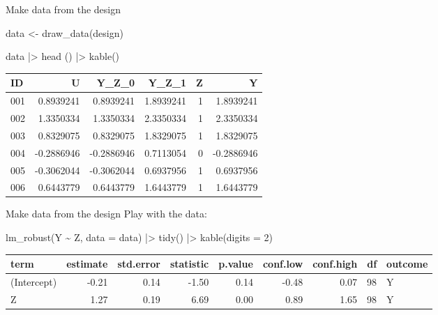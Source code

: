 \documentclass[
  11pt,
  ignorenonframetext,
]{beamer}
\newenvironment{Shaded}{\begin{snugshade}}{\end{snugshade}}
\newcommand{\AttributeTok}[1]{\textcolor[rgb]{0.40,0.45,0.13}{#1}}
\newcommand{\DecValTok}[1]{\textcolor[rgb]{0.68,0.00,0.00}{#1}}
\newcommand{\FunctionTok}[1]{\textcolor[rgb]{0.28,0.35,0.67}{#1}}
\newcommand{\NormalTok}[1]{\textcolor[rgb]{0.00,0.23,0.31}{#1}}
\newcommand{\OtherTok}[1]{\textcolor[rgb]{0.00,0.23,0.31}{#1}}
\newcommand{\SpecialCharTok}[1]{\textcolor[rgb]{0.37,0.37,0.37}{#1}}
\begin{document}
\begin{frame}[fragile]{Make data from the design}
\protect\hypertarget{make-data-from-the-design}{}
\begin{Shaded}
\begin{Highlighting}[]
\NormalTok{data }\OtherTok{\textless{}{-}} \FunctionTok{draw\_data}\NormalTok{(design)}

\NormalTok{data }\SpecialCharTok{|\textgreater{}} \FunctionTok{head}\NormalTok{ () }\SpecialCharTok{|\textgreater{}} \FunctionTok{kable}\NormalTok{()}
\end{Highlighting}
\end{Shaded}

\begin{tabular}{l|r|r|r|r|r}
\hline
ID & U & Y\_Z\_0 & Y\_Z\_1 & Z & Y\\
\hline
001 & 0.8939241 & 0.8939241 & 1.8939241 & 1 & 1.8939241\\
\hline
002 & 1.3350334 & 1.3350334 & 2.3350334 & 1 & 2.3350334\\
\hline
003 & 0.8329075 & 0.8329075 & 1.8329075 & 1 & 1.8329075\\
\hline
004 & -0.2886946 & -0.2886946 & 0.7113054 & 0 & -0.2886946\\
\hline
005 & -0.3062044 & -0.3062044 & 0.6937956 & 1 & 0.6937956\\
\hline
006 & 0.6443779 & 0.6443779 & 1.6443779 & 1 & 1.6443779\\
\hline
\end{tabular}
\end{frame}

\begin{frame}[fragile]{Make data from the design}
\protect\hypertarget{make-data-from-the-design-1}{}
Play with the data:

\begin{Shaded}
\begin{Highlighting}[]
\FunctionTok{lm\_robust}\NormalTok{(Y }\SpecialCharTok{\textasciitilde{}}\NormalTok{ Z, }\AttributeTok{data =}\NormalTok{ data) }\SpecialCharTok{|\textgreater{}}
  \FunctionTok{tidy}\NormalTok{() }\SpecialCharTok{|\textgreater{}}
  \FunctionTok{kable}\NormalTok{(}\AttributeTok{digits =} \DecValTok{2}\NormalTok{)}
\end{Highlighting}
\end{Shaded}

\begin{tabular}{l|r|r|r|r|r|r|r|l}
\hline
term & estimate & std.error & statistic & p.value & conf.low & conf.high & df & outcome\\
\hline
(Intercept) & -0.21 & 0.14 & -1.50 & 0.14 & -0.48 & 0.07 & 98 & Y\\
\hline
Z & 1.27 & 0.19 & 6.69 & 0.00 & 0.89 & 1.65 & 98 & Y\\
\hline
\end{tabular}
\end{frame}
\end{document}
